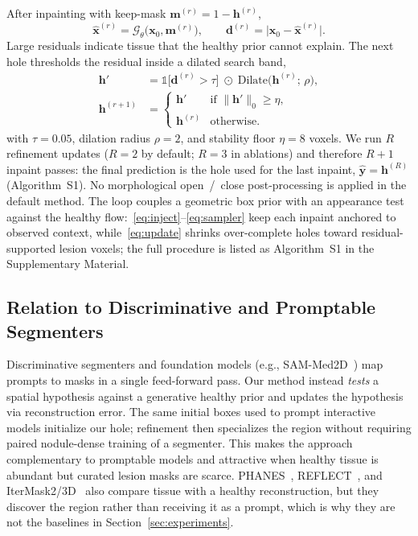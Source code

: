 \documentclass[twoside]{article}
\newcommand{\suppAlgRefine}{Algorithm~S1}
\begin{document}
After inpainting with keep-mask \(\mathbf{m}^{(r)}=1-\mathbf{h}^{(r)}\),
\begin{equation}
\label{eq:residual}
\hat{\mathbf{x}}^{(r)}
=
\mathcal{G}_\theta\!\bigl(\mathbf{x}_0,\mathbf{m}^{(r)}\bigr),
\qquad
\mathbf{d}^{(r)}
=
\bigl|\mathbf{x}_0-\hat{\mathbf{x}}^{(r)}\bigr|.
\end{equation}
Large residuals indicate tissue that the healthy prior cannot explain.
The next hole thresholds the residual inside a dilated search band,
\begin{equation}
\label{eq:update}
\begin{aligned}
\mathbf{h}'
&=
\mathbb{1}\!\bigl[\mathbf{d}^{(r)}>\tau\bigr]
\;\odot\;
\mathrm{Dilate}\!\bigl(\mathbf{h}^{(r)};\,\rho\bigr),
\\
\mathbf{h}^{(r+1)}
&=
\begin{cases}
\mathbf{h}' & \text{if }\|\mathbf{h}'\|_0\ge\eta,\\
\mathbf{h}^{(r)} & \text{otherwise.}
\end{cases}
\end{aligned}
\end{equation}
with \(\tau{=}0.05\), dilation radius \(\rho{=}2\), and stability floor
\(\eta{=}8\) voxels.
We run \(R\) refinement updates (\(R{=}2\) by default; \(R{=}3\) in
ablations) and therefore \(R{+}1\) inpaint passes: the final prediction is
the hole used for the last inpaint, \(\hat{\mathbf{y}}=\mathbf{h}^{(R)}\)
(\suppAlgRefine{}).
No morphological open~/~close post-processing is applied in the default method.
The loop couples a geometric box prior with an appearance test against the
healthy flow:~\eqref{eq:inject}--\eqref{eq:sampler} keep each inpaint
anchored to observed context, while~\eqref{eq:update} shrinks over-complete
holes toward residual-supported lesion voxels; the full procedure is
listed as \suppAlgRefine{} in the Supplementary Material.

\subsection{Relation to Discriminative and Promptable Segmenters}
\label{sec:method:discuss}

Discriminative segmenters and foundation models (e.g.,
SAM-Med2D~\citep{sam_med2d2023}) map prompts to masks in a single feed-forward
pass.
Our method instead \emph{tests} a spatial hypothesis against a generative
healthy prior and updates the hypothesis via reconstruction error.
The same initial boxes used to prompt interactive models initialize our hole;
refinement then specializes the region without requiring paired nodule-dense
training of a segmenter.
This makes the approach complementary to promptable models and attractive when
healthy tissue is abundant but curated lesion masks are scarce.
PHANES~\citep{phanes2023}, REFLECT~\citep{reflect2025}, and
IterMask2/3D~\citep{itermask2024,itermask3d2025} also compare tissue with
a healthy reconstruction, but they discover the region rather than
receiving it as a prompt, which is why they are not the baselines in
Section~\ref{sec:experiments}.
\end{document}
